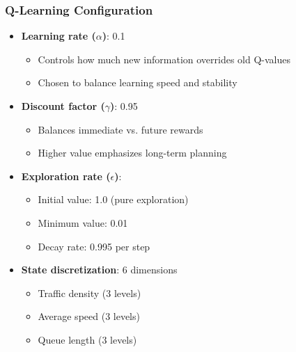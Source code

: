 \documentclass[a4paper, 12pt]{article}
\begin{document}
\subsubsection{Q-Learning Configuration}
\begin{tcolorbox}[title=Q-Learning Parameters]
\begin{itemize}
    \item \textbf{Learning rate ($\alpha$)}: 0.1
    \begin{itemize}
        \item Controls how much new information overrides old Q-values
        \item Chosen to balance learning speed and stability
    \end{itemize}
    \item \textbf{Discount factor ($\gamma$)}: 0.95
    \begin{itemize}
        \item Balances immediate vs. future rewards
        \item Higher value emphasizes long-term planning
    \end{itemize}
    \item \textbf{Exploration rate ($\epsilon$)}: 
    \begin{itemize}
        \item Initial value: 1.0 (pure exploration)
        \item Minimum value: 0.01
        \item Decay rate: 0.995 per step
    \end{itemize}
    \item \textbf{State discretization}: 6 dimensions
    \begin{itemize}
        \item Traffic density (3 levels)
        \item Average speed (3 levels)
        \item Queue length (3 levels)
    \end{itemize}
\end{itemize}
\end{tcolorbox}
\end{document}

